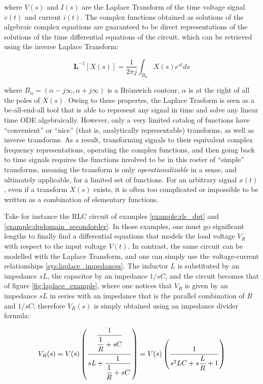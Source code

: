 	\noindent where $V(s)$ and $I(s)$ are the Laplace Transform of the time voltage signal $v(t)$ and current $i(t)$. The complex functions obtained as solutions of the algebraic complex equations are guaranteed to be direct representations of the solutions of the time differential equations of the circuit, which can be retrieved using the inverse Laplace Transform:

\begin{equation} \mathbf{L}^{-1}\left[X(s)\right] = \dfrac{1}{2\pi j} \int_{B_\alpha} X(s)e^{st}ds \label{eq:inverse_laplace_def}\end{equation}

	\noindent where $B_\alpha = \left(\alpha - j\infty,\alpha + j\infty\right)$ is a Brömwich contour, $\alpha$ is at the right of all the poles of $X(s)$. Owing to these propertes, the Laplace Trasform is seen as a be-all-end-all tool that is able to represent any signal in time and solve any linear time ODE algebraically. However, only a very limited catalog of functions have ``convenient'' or ``nice'' (that is, analytically representable) transforms, as well as inverse transforms. As a result, transforming signals to their equivalent complex frequency representations, operating the complex functions, and then going back to time signals requires the functions involved to be in this roster of ``simple'' transforms, meaning the transform is only \textit{operationalizable} in a sense, and ultimately applicable, for a limited set of functions. For an arbitrary signal $x(t)$, even if a transform $X(s)$ exists, it is often too complicated or impossible to be written as a combination of elementary functions.

	Take for instance the RLC circuit of examples \ref{example:rlc_dpt} and \ref{example:dpdomain_secondorder}. In those examples, one must go significant lengths to finally find a differential equations that models the load voltage $V_R$ with respect to the input voltage $V(t)$. In contrast, the same circuit can be modelled with the Laplace Transform, and one can simply use the voltage-current relationships \eqref{sys:laplace_impedances}. The inductor $L$ is substituted by an impedance $sL$, the capacitor by an impedance $1/sC$, and the circuit becomes that of figure \ref{fig:laplace_example}, where one notices that $V_R$ is given by an impedance $sL$ in series with an impedance that is the parallel combination of $R$ and $1/sC$; therefore $V_R(s)$ is simply obtained using an impedance divider formula:

\begin{equation} V_R(s) = V(s) \left( \dfrac{\raisebox{-8mm}{} \dfrac{1}{\raisebox{5mm}{} \dfrac{1}{R} + sC}}{\raisebox{5mm}{} sL + \dfrac{1}{\raisebox{5mm}{} \dfrac{1}{R} + sC}}\right) = V(s)\left( \dfrac{1}{\raisebox{5mm}{} s^2LC + s\dfrac{L}{R} + 1}\right) \label{eq:rlc_laplace_model}\end{equation}

